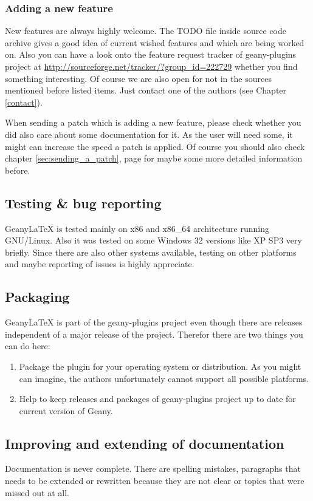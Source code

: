 \documentclass[%
paper=a4,%
fontsize=11pt,%
twoside=false,%
DIV18,%
headsepline,%
plainheadsepline,%
footsepline,%
plainfootsepline,%
bibliography=totoc,%
listof=totoc,%
BCOR10mm,%
parskip=half,%
openany,%
]{scrartcl}
\begin{document}
\subsubsection{Adding a new feature}
New features are always highly welcome. The TODO file inside source
code archive gives a good idea of current wished features and which
are being worked on. Also you can have a look onto the feature request
tracker of geany-plugins project at
\url{http://sourceforge.net/tracker/?group\_id=222729} whether you find
something interesting. Of course we are also open for not in the
sources mentioned before listed items. Just contact one of the authors
(see Chapter \ref{contact}).

When sending a patch which is adding a new feature, please check
whether you did also care about some documentation for it. As the
user will need some, it might can increase the speed a patch is
applied. Of course you should also check chapter \ref{sec:sending_a_patch},
page \pageref{sec:sending_a_patch} for maybe some more detailed
information before.

\subsection{Testing \& bug reporting} Geany\LaTeX{} is tested mainly
on x86 and x86\_64 architecture running GNU/Linux. Also it was
tested on some Windows 32 versions like XP SP3 very briefly. Since
there are also other systems available, testing on other platforms
and maybe reporting of issues is highly appreciate.

\subsection{Packaging}
Geany\LaTeX{} is part of the geany-plugins project even though there
are releases independent of a major release of the project. Therefor
there are two things you can do here:
\begin{enumerate}
	\item Package the plugin for your operating system or
	distribution. As you might can imagine, the authors unfortunately
	cannot support all possible platforms.
	\item Help to keep releases and packages of geany-plugins project
	up to date for current version of Geany.
\end{enumerate}


\subsection{Improving and extending of documentation}
Documentation is never complete. There are spelling mistakes,
paragraphs that needs to be extended or rewritten because they are not
clear or topics that were missed out at all.
\end{document}

